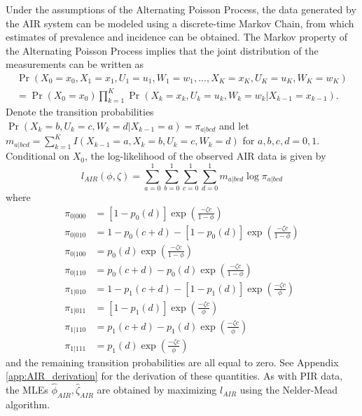 \documentclass[man, noextraspace, floatsintext]{apa6}\usepackage[]{graphicx}\usepackage[]{color}
\begin{document}
Under the assumptions of the Alternating Poisson Process, the data generated by the AIR system can be modeled using a discrete-time Markov Chain, from which estimates of prevalence and incidence can be obtained. 
The Markov property of the Alternating Poisson Process implies that the joint distribution of the measurements can be written as
\begin{multline}
\Pr\left(X_0=x_0,X_1=x_1,U_1 = u_1, W_1 = w_1,..., X_K=x_K, U_K = u_K, W_K = w_K \right) \\ = \Pr\left(X_0 = x_0\right) \prod_{k=1}^K \Pr\left(X_k = x_k, U_k = u_k, W_k = w_k | X_{k-1} = x_{k-1}\right). 
\end{multline}
Denote the transition probabilities $\Pr\left(X_k = b, U_k = c, W_k = d | X_{k-1} = a\right) = \pi_{a|bcd}$ and let $m_{a|bcd} = \sum_{k=1}^K I\left(X_{k-1} = a, X_k = b, U_k = c, W_k = d \right)$ for $a,b,c,d = 0,1$. 
Conditional on $X_0$, the log-likelihood of the observed AIR data is given by
\begin{equation}
\label{eq:AIR_loglik}
l_{AIR}\left(\phi,\zeta\right) = \sum_{a=0}^1 \sum_{b=0}^1 \sum_{c=0}^1 \sum_{d=0}^1 m_{a|bcd} \log \pi_{a|bcd}
\end{equation}
where
\begin{align*}
\pi_{0|000} &= \left[1 - p_0(d)\right]\exp\left(\frac{- \zeta c}{1 - \phi}\right) \\
\pi_{0|010} &= 1 - p_0(c + d) - \left[1 - p_0(d)\right]\exp\left(\frac{- \zeta c}{1 - \phi}\right) \\
\pi_{0|100} &= p_0(d)\exp\left(\frac{- \zeta c}{1 - \phi}\right) \\
\pi_{0|110} &= p_0(c + d) - p_0(d) \exp\left(\frac{- \zeta c}{1 - \phi}\right) \\
\pi_{1|010} &= 1 - p_1(c + d) - \left[1 - p_1(d)\right]\exp\left(\frac{- \zeta c}{\phi}\right) \\
\pi_{1|011} &= \left[1 - p_1(d)\right]\exp\left(\frac{- \zeta c}{\phi}\right) \\
\pi_{1|110} &= p_1(c + d) - p_1(d) \exp\left(\frac{- \zeta c}{\phi}\right) \\
\pi_{1|111} &= p_1(d)\exp\left(\frac{- \zeta c}{\phi}\right)
\end{align*}
and the remaining transition probabilities are all equal to zero. 
See Appendix \ref{app:AIR_derivation} for the derivation of these quantities. 
As with PIR data, the MLEs $\hat\phi_{AIR}, \hat\zeta_{AIR}$ are obtained by maximizing $l_{AIR}$ using the Nelder-Mead algorithm. 
\end{document}
